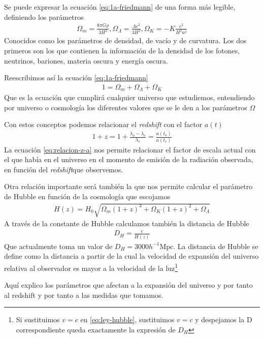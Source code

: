 Se puede expresar la ecuación \eqref{eq:1a-friedmann} de una forma más legible, definiendo los parámetros 
\begin{align}
\Omega_m = \frac{8\pi G \rho}{3H^2}, \Omega_\Lambda = \frac{\Lambda c^2}{3H^2}, \Omega_K = -K\frac{c^2}{H^2a^2} 
\end{align}
Conocidos como los parámetros de densidad, de vacío y de curvatura. Los dos primeros son los que contienen la información de la densidad de los fotones, neutrinos, bariones, materia oscura y energía oscura.

Reescribimos así la ecuación \eqref{eq:1a-friedmann}
\begin{align}
	1 = \Omega_m + \Omega_\Lambda + \Omega_K
\end{align}
Que es la ecuación que cumplirá cualquier universo que estudiemos, entendiendo por universo o cosmología los diferentes valores que se le den a los parámetros $\Omega$

Con estos conceptos podemos relacionar el \textit{redshift} con el factor $a(t)$ 
\begin{align}
	1+z = 1+  \frac{\lambda_o - \lambda_e}{\lambda_e} = \frac{a(t_o)}{a(t_e)}
	\label{eq:relacion-z-a}
\end{align}
La ecuación \eqref{eq:relacion-z-a} nos permite relacionar el factor de escala actual con el que había en el universo en el momento de emisión de la radiación observada, en función del \textit{redshift}que observemos.

Otra relación importante será también la que nos permite calcular el parámetro de Hubble en función de la cosmología que escojamos 
\begin{align}
	H(z) = H_0 \sqrt{\Omega_m(1+z)^3 + \Omega_K(1+z)^2 + \Omega_\Lambda} 
\end{align}
A través de la constante de Hubble calculamos también la distancia de Hubble 
\begin{align}
	D_H = \frac{c}{H(z)}
	\label{eq:distancia-hubble}
\end{align}
Que actualmente toma un valor de $D_H = 3000h^{-1}\text{Mpc}$. La distancia de Hubble se define como la distancia a partir de la cual la velocidad de expansión del universo relativa al observador es mayor a la velocidad de la luz\footnote{Si sustituimos $v=c$ en \eqref{eq:ley-hubble}, sustituimos $v=c$ y despejamos la D correspondiente queda exactamente la expresión de $D_H$}


Aquí explico los parámetros que afectan a la expansión del universo y por tanto al redshift y por tanto a las medidas que tomamos.


